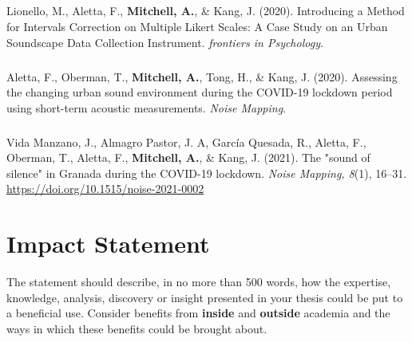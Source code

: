 \documentclass[twoside,fontsize=12pt,titlepage,chapterprefix=true
]{scrbook}
\begin{document}
\paragraph*{}Lionello, M., Aletta, F., \textbf{Mitchell, A.}, \& Kang, J. (2020). Introducing a Method for Intervals Correction on Multiple Likert Scales: A Case Study on an Urban Soundscape Data Collection Instrument. \emph{frontiers in Psychology}.

\paragraph*{}Aletta, F., Oberman, T., \textbf{Mitchell, A.}, Tong, H., \& Kang, J. (2020). Assessing the changing urban sound environment during the COVID-19 lockdown period using short-term acoustic measurements. \emph{Noise Mapping}.

\paragraph*{}Vida Manzano, J., Almagro Pastor, J. A, Garc\'ia Quesada, R., Aletta, F., Oberman, T., Aletta, F., \textbf{Mitchell, A.}, \& Kang, J. (2021). The "sound of silence" in Granada during the COVID-19 lockdown. \emph{Noise Mapping, 8}(1), 16--31. \url{https://doi.org/10.1515/noise-2021-0002} 





\chapter*{Impact Statement}
The statement should describe, in no more than 500 words, how the expertise, knowledge, analysis, discovery or insight presented in your thesis could be put to a beneficial use. Consider benefits from \textbf{inside} and \textbf{outside} academia and the ways in which these benefits could be brought about.
\end{document}
